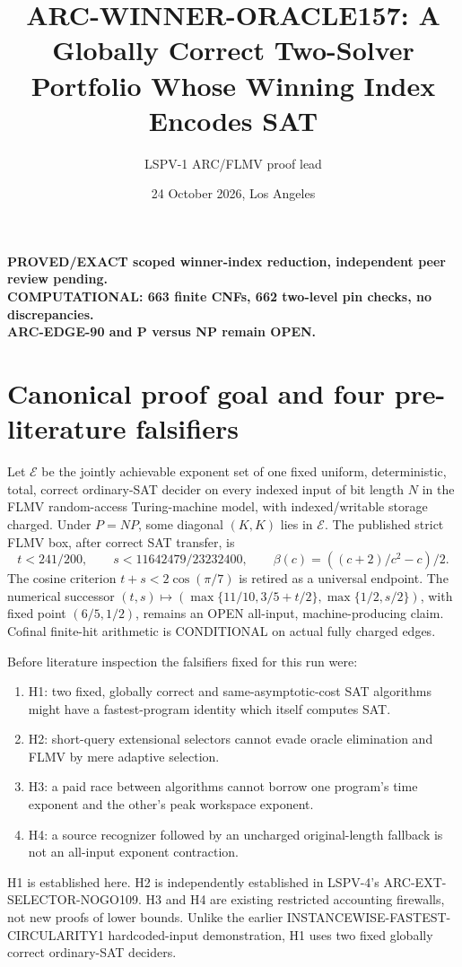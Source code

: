 \documentclass[11pt]{article}
\title{ARC-WINNER-ORACLE157: A Globally Correct Two-Solver Portfolio Whose Winning Index Encodes SAT}
\author{LSPV-1 ARC/FLMV proof lead}
\date{24 October 2026, Los Angeles}
\begin{document}
\maketitle
\begin{center}
\textbf{PROVED/EXACT scoped winner-index reduction, independent peer review pending.}\\
\textbf{COMPUTATIONAL: 663 finite CNFs, 662 two-level pin checks, no discrepancies.}\\
\textbf{ARC-EDGE-90 and P versus NP remain OPEN.}
\end{center}

\section{Canonical proof goal and four pre-literature falsifiers}
Let \(\mathcal E\) be the jointly achievable exponent set of one fixed uniform, deterministic, total, correct ordinary-SAT decider on every indexed input of bit length \(N\) in the FLMV random-access Turing-machine model, with indexed/writable storage charged. Under \(P=NP\), some diagonal \((K,K)\) lies in \(\mathcal E\). The published strict FLMV box, after correct SAT transfer, is
\[
t<241/200,\qquad s<11642479/23232400,\qquad
\beta(c)=((c+2)/c^2-c)/2.
\]
The cosine criterion \(t+s<2\cos(\pi/7)\) is retired as a universal endpoint.
The numerical successor \((t,s)\mapsto(\max\{11/10,3/5+t/2\},\max\{1/2,s/2\})\), with fixed point \((6/5,1/2)\), remains an OPEN all-input, machine-producing claim. Cofinal finite-hit arithmetic is CONDITIONAL on actual fully charged edges.

Before literature inspection the falsifiers fixed for this run were:
\begin{enumerate}
\item[] H1: two fixed, globally correct and same-asymptotic-cost SAT algorithms might have a fastest-program identity which itself computes SAT.
\item[] H2: short-query extensional selectors cannot evade oracle elimination and FLMV by mere adaptive selection.
\item[] H3: a paid race between algorithms cannot borrow one program's time exponent and the other's peak workspace exponent.
\item[] H4: a source recognizer followed by an uncharged original-length fallback is not an all-input exponent contraction.
\end{enumerate}
H1 is established here. H2 is independently established in LSPV-4's ARC-EXT-SELECTOR-NOGO109. H3 and H4 are existing restricted accounting firewalls, not new proofs of lower bounds. Unlike the earlier INSTANCEWISE-FASTEST-CIRCULARITY1 hardcoded-input demonstration, H1 uses two fixed globally correct ordinary-SAT deciders.
\end{document}
